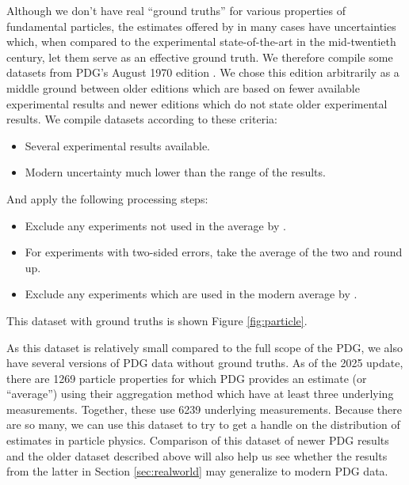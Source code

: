 \documentclass[letterpaper,12pt]{article}
\begin{document}
Although we don't have real ``ground truths'' for various properties of fundamental particles, the estimates offered by \citet{navas2024review} in many cases have uncertainties which, when compared to the experimental state-of-the-art in the mid-twentieth century, let them serve as an effective ground truth. We therefore compile some datasets from PDG's August 1970 edition \citet{roos1970review}. We chose this edition arbitrarily as a middle ground between older editions which are based on fewer available experimental results and newer editions which do not state older experimental results. We compile datasets according to these criteria:
\begin{itemize}
  \item Several experimental results available.
  \item Modern uncertainty much lower than the range of the results.
\end{itemize}
And apply the following processing steps:
\begin{itemize}
  \item Exclude any experiments not used in the average by \citet{roos1970review}.
  \item For experiments with two-sided errors, take the average of the two and round up.
  \item Exclude any experiments which are used in the modern average by \citet{navas2024review}.
\end{itemize}
This dataset with ground truths is shown Figure \ref{fig:particle}.

As this dataset is relatively small compared to the full scope of the PDG, we also have several versions of PDG data without ground truths. As of the 2025 update, there are 1269 particle properties for which PDG provides an estimate (or ``average'') using their aggregation method which have at least three underlying measurements. Together, these use 6239 underlying measurements. Because there are so many, we can use this dataset to try to get a handle on the distribution of estimates in particle physics. Comparison of this dataset of newer PDG results and the older dataset described above will also help us see whether the results from the latter in Section \ref{sec:realworld} may generalize to modern PDG data.
\end{document}
